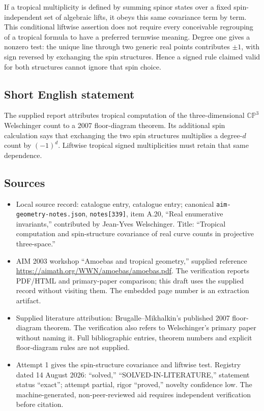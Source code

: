 \documentclass[11pt]{article}
\begin{document}
If a tropical multiplicity is defined by summing spinor states over a fixed spin-independent set of algebraic lifts, it obeys this same covariance term by term. This conditional liftwise assertion does not require every conceivable regrouping of a tropical formula to have a preferred termwise meaning. Degree one gives a nonzero test: the unique line through two generic real points contributes \(\pm1\), with sign reversed by exchanging the spin structures. Hence a signed rule claimed valid for both structures cannot ignore that spin choice.
\subsection{Short English statement}
The supplied report attributes tropical computation of the three-dimensional \(\mathbb{CP}^3\) Welschinger count to a 2007 floor-diagram theorem. Its additional spin calculation says that exchanging the two spin structures multiplies a degree-\(d\) count by \((-1)^d\). Liftwise tropical signed multiplicities must retain that same dependence.
\subsection{Sources}
\begin{itemize}
\item Local source record: catalogue entry, catalogue entry; canonical \texttt{aim-geometry-notes.json}, \texttt{notes[339]}, item A.20, ``Real enumerative invariants,'' contributed by Jean-Yves Welschinger. Title: ``Tropical computation and spin-structure covariance of real curve counts in projective three-space.''
\item AIM 2003 workshop ``Amoebas and tropical geometry,'' supplied reference \url{https://aimath.org/WWN/amoebas/amoebas.pdf}. The verification reports PDF/HTML and primary-paper comparison; this draft uses the supplied record without visiting them. The embedded page number is an extraction artifact.
\item Supplied literature attribution: Brugalle--Mikhalkin's published 2007 floor-diagram theorem. The verification also refers to Welschinger's primary paper without naming it. Full bibliographic entries, theorem numbers and explicit floor-diagram rules are not supplied.
\item Attempt 1 gives the spin-structure covariance and liftwise test. Registry dated 14 August 2026: ``solved,'' ``SOLVED-IN-LITERATURE,'' statement status ``exact''; attempt partial, rigor ``proved,'' novelty confidence low. The machine-generated, non-peer-reviewed aid requires independent verification before citation.
\end{itemize}
\end{document}
